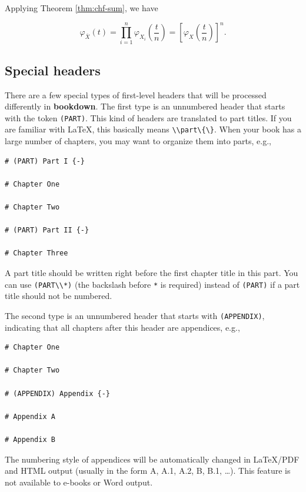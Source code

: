 \documentclass[doctor,openright,twoside]{sjtuthesis}
\newcommand{\passthrough}[1]{#1}
\theoremstyle{plain}
\theoremstyle{definition}
\theoremstyle{remark}
\theoremstyle{ocrenumbox}
\theoremstyle{plain}
\let\BeginKnitrBlock\begin \let\EndKnitrBlock\end
\begin{document}
\BeginKnitrBlock{solution}
{}Applying Theorem \ref{thm:chf-sum}, we have

\[\varphi _{\bar{X}}(t)=\prod_{i=1}^n \varphi _{X_i}\left(\frac{t}{n}\right)=\left[\varphi _{X}\left(\frac{t}{n}\right)\right]^n.\]
\EndKnitrBlock{solution}

\hypertarget{special-headers}{%
\subsection{Special headers}\label{special-headers}}

There are a few special types of first-level headers that will be processed differently in \textbf{bookdown}. The first type is an unnumbered header that starts with the token \passthrough{\lstinline!(PART)!}. This kind of headers are translated to part titles. If you are familiar with LaTeX, this basically means \passthrough{\lstinline!\\part\{\}!}. When your book has a large number of chapters, you may want to organize them into parts, e.g.,

\begin{lstlisting}
# (PART) Part I {-} 

# Chapter One

# Chapter Two

# (PART) Part II {-} 

# Chapter Three
\end{lstlisting}

A part title should be written right before the first chapter title in this part. You can use \passthrough{\lstinline!(PART\\*)!} (the backslash before \passthrough{\lstinline!*!} is required) instead of \passthrough{\lstinline!(PART)!} if a part title should not be numbered.

The second type is an unnumbered header that starts with \passthrough{\lstinline!(APPENDIX)!}, indicating that all chapters after this header are appendices, e.g.,

\begin{lstlisting}
# Chapter One 

# Chapter Two

# (APPENDIX) Appendix {-} 

# Appendix A

# Appendix B
\end{lstlisting}

The numbering style of appendices will be automatically changed in LaTeX/PDF and HTML output (usually in the form A, A.1, A.2, B, B.1, \ldots). This feature is not available to e-books or Word output.
\end{document}
